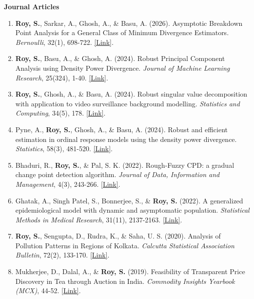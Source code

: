 \documentclass[11pt]{developercv} %
\begin{document}
\textbf{Journal Articles}
\begin{enumerate}
    \item \textbf{Roy, S.}, Sarkar, A., Ghosh, A., \& Basu, A. (2026). Asymptotic Breakdown Point Analysis for a General Class of Minimum Divergence Estimators. \emph{Bernoulli}, 32(1), 698-722. \href{https://projecteuclid.org/journals/bernoulli/volume-32/issue-1/Asymptotic-breakdown-point-analysis-for-a-general-class-of-minimum/10.3150/25-BEJ1876.short}{[Link]}.
    \item \textbf{Roy, S.}, Basu, A., \& Ghosh, A. (2024). Robust Principal Component Analysis using Density Power Divergence. \emph{Journal of Machine Learning Research}, 25(324), 1-40. \href{https://www.jmlr.org/papers/v25/23-1096.html}{[Link]}.
    \item \textbf{Roy, S.}, Ghosh, A., \& Basu, A. (2024). Robust singular value decomposition with application to video surveillance background modelling. \emph{Statistics and Computing}, 34(5), 178. \href{https://link.springer.com/article/10.1007/s11222-024-10493-7}{[Link]}.
    \item Pyne, A., \textbf{Roy, S.}, Ghosh, A., \& Basu, A. (2024). Robust and efficient estimation in ordinal response models using the density power divergence. \emph{Statistics}, 58(3), 481-520. \href{https://www.tandfonline.com/doi/abs/10.1080/02331888.2024.2347329}{[Link]}.        
    \item Bhaduri, R., \textbf{Roy, S.}, \& Pal, S. K. (2022). Rough-Fuzzy CPD: a gradual change point detection algorithm. \emph{Journal of Data, Information and Management}, 4(3), 243-266. \href{https://link.springer.com/article/10.1007/s42488-022-00077-3}{[Link]}.
    \item Ghatak, A., Singh Patel, S., Bonnerjee, S., \& \textbf{Roy, S.} (2022). A generalized epidemiological model with dynamic and asymptomatic population. \emph{Statistical Methods in Medical Research}, 31(11), 2137-2163. \href{https://journals.sagepub.com/doi/abs/10.1177/09622802221115877}{[Link]}.
    \item \textbf{Roy, S.}, Sengupta, D., Rudra, K., \& Saha, U. S. (2020). Analysis of Pollution Patterns in Regions of Kolkata. \emph{Calcutta Statistical Association Bulletin}, 72(2), 133-170. \href{https://journals.sagepub.com/doi/abs/10.1177/0008068320976781}{[Link]}.
    \item Mukherjee, D., Dalal, A., \& \textbf{Roy, S.} (2019). Feasibility of Transparent Price Discovery in Tea through Auction in India. \emph{Commodity Insights Yearbook (MCX)}, 44-52. \href{https://www.mcxindia.com/docs/default-source/about-us/commodity-insights-yearbook/2019/02-emerging-trends/feasibility-of-transparent-price-discovery-in-tea-through-auction-in-india-dr-diganta-mukherjee-mr-abhinandan-dalal-and-mr-subhrajyoty-roy.pdf}{[Link]}.
\end{enumerate}
\end{document}
